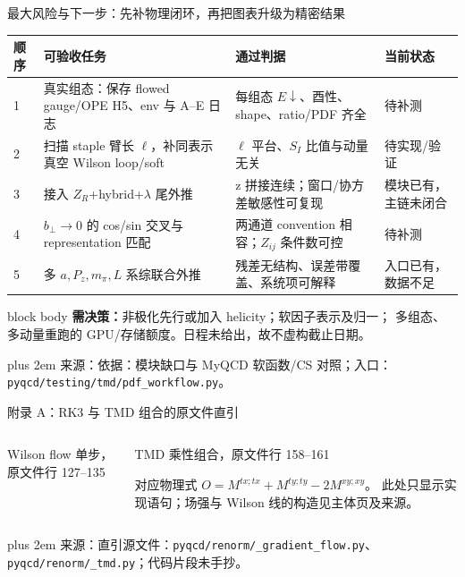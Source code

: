 \documentclass[UTF8,aspectratio=169,11pt]{ctexbeamer}
\renewcommand{\arraystretch}{0.92}
\newcommand{\source}[1]{%
  \par\vspace{0.02em}\begingroup\fontsize{6}{6.8}\selectfont\raggedright\sloppy
  \setlength{\emergencystretch}{3em}\rightskip=0pt plus 2em
  \color{muted}来源：#1\par\endgroup}
\begin{document}
\begin{frame}[t]{最大风险与下一步：先补物理闭环，再把图表升级为精密结果}
  \footnotesize
  \renewcommand{\arraystretch}{0.82}
  \begin{tabularx}{0.98\textwidth}{@{}p{}Yp{0.30\textwidth}Y@{}}
    \toprule
    顺序 & 可验收任务 & 通过判据 & 当前状态\\
     & 真实组态：保存 flowed gauge/OPE H5、env 与 A--E 日志 & 每组态 \(E\downarrow\)、酉性、shape、ratio/PDF 齐全 & 待补测\\
    2 & 扫描 staple 臂长 \(\ell\)，补同表示真空 Wilson loop/soft & \(\ell\) 平台、\(S_I\) 比值与动量无关 & 待实现/验证\\
    3 & 接入 \(Z_R\)+hybrid+\(\lambda\) 尾外推 & z 拼接连续；窗口/协方差敏感性可复现 & 模块已有，主链未闭合\\
    4 & \(b_\perp\to0\) 的 cos/sin 交叉与 representation 匹配 & 两通道 convention 相容；\(Z_{ij}\) 条件数可控 & 待补测\\
    5 & 多 \(a,P_z,m_\pi,L\) 系综联合外推 & 残差无结构、误差带覆盖、系统项可解释 & 入口已有，数据不足\\
    \bottomrule
  \end{tabularx}
  \vspace{0.1em}
  \begin{beamercolorbox}[wd=0.98\textwidth,sep=0.18em,rounded=true]{block body}
    \scriptsize\textbf{需决策：}非极化先行或加入 helicity；软因子表示及归一；
    多组态、多动量重跑的 GPU/存储额度。日程未给出，故不虚构截止日期。
  \end{beamercolorbox}
  \source{依据：模块缺口与 MyQCD 软函数/CS 对照；入口：\nolinkurl{pyqcd/testing/tmd/pdf_workflow.py}。}
\end{frame}

\appendix

\begin{frame}[t]{附录 A：RK3 与 TMD 组合的原文件直引}
  \begin{columns}[T,totalwidth=\textwidth]
    \begin{column}{0.47\textwidth}
      \begin{block}{Wilson flow 单步，原文件行 127--135}
        
      \end{block}
    \end{column}
    \begin{column}{0.47\textwidth}
      \begin{block}{TMD 乘性组合，原文件行 158--161}
        
      \end{block}
      \begin{block}{对应物理式}
        \(O=M^{tx;tx}+M^{ty;ty}-2M^{xy;xy}\)。
        此处只显示实现语句；场强与 Wilson 线的构造见主体页及来源。
      \end{block}
    \end{column}
  \end{columns}
  \source{直引源文件：\nolinkurl{pyqcd/renorm/_gradient_flow.py}、\nolinkurl{pyqcd/renorm/_tmd.py}；代码片段未手抄。}
\end{frame}
\end{document}
